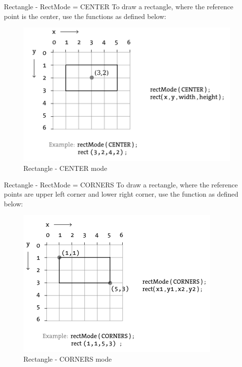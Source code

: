 \documentclass{beamer}
\begin{document}
\begin{frame}{Rectangle - RectMode = CENTER}
To draw a rectangle, where the reference point is the center, use the
functions as defined below:\\

\begin{figure}[H]
\centerline{\includegraphics[scale=0.5]{rectangle_center_mode.png}}
\caption{Rectangle - CENTER mode}
\end{figure}
\end{frame}

\begin{frame}{Rectangle - RectMode = CORNERS}
To draw a rectangle, where the reference points are upper left corner
and lower right corner, use the function as defined below:\\

\begin{figure}[H]
\centerline{\includegraphics[scale=0.5]{rectangle_corners_mode.png}}
\caption{Rectangle - CORNERS mode}
\end{figure}
\end{frame}
\end{document}
